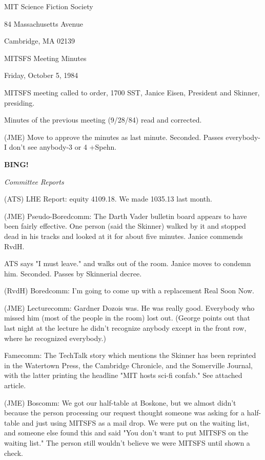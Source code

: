 \documentclass[12pt]{article}
\newcommand{\bing}{{\bf BING!} }
\newcommand{\goto}[1]{\bing \vskip 12pt \centerline{{\em{#1}}}}
\begin{document}
\begin{center}

MIT Science Fiction Society 

84 Massachusetts Avenue

Cambridge, MA 02139

\vspace{12pt}

MITSFS Meeting Minutes 

Friday, October 5, 1984

\end{center}
 
\vspace{18pt}

\setlength{\parskip}{6pt}

\noindent
MITSFS meeting called to order, 1700 SST,
Janice Eisen, President and Skinner, presiding.

Minutes of the previous meeting (9/28/84) read and corrected.

(JME) Move to approve the minutes as last minute. Seconded. Passes everybody-I don't see anybody-3 or 4 +Spehn.

\goto{Committee Reports}

(ATS) LHE Report: equity 4109.18. We made 1035.13 last month.

(JME) Pseudo-Boredcomm: The Darth Vader bulletin board appears to have been fairly effective. One person (said the Skinner) walked by it and stopped dead in his tracks and looked at it for about five minutes. Janice commends RvdH.

ATS says "I must leave." and walks out of the room. Janice moves to condemn him. Seconded. Passes by Skinnerial decree.

(RvdH) Boredcomm: I'm going to come up with a replacement Real Soon Now.

(JME) Lecturecomm: Gardner Dozois was. He was really good. Everybody who missed him (most of the people in the room) lost out. (George points out that last night at the lecture he didn't recognize anybody except in the front row, where he recognized everybody.)

Famecomm:  The TechTalk story which mentions the Skinner has been reprinted in the Watertown Press, the Cambridge Chronicle, and the Somerville Journal, with the latter printing the headline "MIT hosts sci-fi confab." See attached article.

(JME) Boscomm: We got our half-table at Boskone, but we almost didn't because the person processing our request thought someone was asking for a half-table and just using MITSFS as a mail drop. We were put on the waiting list, and someone else found this and said "You don't want to put MITSFS on the waiting list." The person still wouldn't believe we were MITSFS until shown a check.
\end{document}
